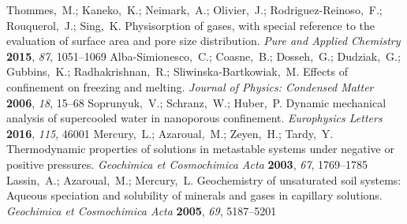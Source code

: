 \documentclass[aps,prl,twocolumn,superscriptaddress,groupedaddress]{revtex4}
\begin{document}
\begin{mcitethebibliography}{88}
{\mcitedefaultendpunct}{\mcitedefaultseppunct}\relax
\EndOfBibitem
{}
Thommes,~M.; Kaneko,~K.; Neimark,~A.; Olivier,~J.; Rodriguez-Reinoso,~F.;
  Rouquerol,~J.; Sing,~K. Physisorption of gases, with special reference to the
  evaluation of surface area and pore size distribution. \emph{Pure and Applied
  Chemistry} \textbf{2015}, \emph{87}, 1051--1069\relax
\mciteBstWouldAddEndPuncttrue
\mciteSetBstMidEndSepPunct{\mcitedefaultmidpunct}
{\mcitedefaultendpunct}{\mcitedefaultseppunct}\relax
\EndOfBibitem
{}
Alba-Simionesco,~C.; Coasne,~B.; Dosseh,~G.; Dudziak,~G.; Gubbins,~K.;
  Radhakrishnan,~R.; Sliwinska-Bartkowiak,~M. Effects of confinement on
  freezing and melting. \emph{Journal of Physics: Condensed Matter}
  \textbf{2006}, \emph{18}, 15--68\relax
\mciteBstWouldAddEndPuncttrue
\mciteSetBstMidEndSepPunct{\mcitedefaultmidpunct}
{\mcitedefaultendpunct}{\mcitedefaultseppunct}\relax
\EndOfBibitem
{}
Soprunyuk,~V.; Schranz,~W.; Huber,~P. Dynamic mechanical analysis of
  supercooled water in nanoporous confinement. \emph{Europhysics Letters}
  \textbf{2016}, \emph{115}, 46001\relax
\mciteBstWouldAddEndPuncttrue
\mciteSetBstMidEndSepPunct{\mcitedefaultmidpunct}
{\mcitedefaultendpunct}{\mcitedefaultseppunct}\relax
\EndOfBibitem
{}
Mercury,~L.; Azaroual,~M.; Zeyen,~H.; Tardy,~Y. Thermodynamic properties of
  solutions in metastable systems under negative or positive pressures.
  \emph{Geochimica et Cosmochimica Acta} \textbf{2003}, \emph{67},
  1769--1785\relax
\mciteBstWouldAddEndPuncttrue
\mciteSetBstMidEndSepPunct{\mcitedefaultmidpunct}
{\mcitedefaultendpunct}{\mcitedefaultseppunct}\relax
\EndOfBibitem
{}
Lassin,~A.; Azaroual,~M.; Mercury,~L. Geochemistry of unsaturated soil systems:
  Aqueous speciation and solubility of minerals and gases in capillary
  solutions. \emph{Geochimica et Cosmochimica Acta} \textbf{2005}, \emph{69},
  5187--5201\relax
\mciteBstWouldAddEndPuncttrue
\mciteSetBstMidEndSepPunct{\mcitedefaultmidpunct}
{\mcitedefaultendpunct}{\mcitedefaultseppunct}\relax
\EndOfBibitem
{}

\end{mcitethebibliography}
\end{document}
